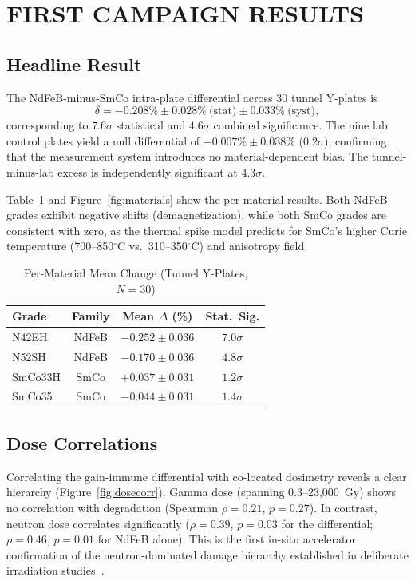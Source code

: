 \documentclass[a4paper,
               ]{jacow}
\begin{document}
\section{FIRST CAMPAIGN RESULTS}

\subsection{Headline Result}

The NdFeB-minus-SmCo intra-plate differential across 30 tunnel Y-plates is
\begin{equation}
\delta = -0.208\% \pm 0.028\%~\text{(stat)} \pm 0.033\%~\text{(syst)},
\end{equation}
corresponding to $7.6\sigma$ statistical and $4.6\sigma$ combined significance. The nine lab control plates yield a null differential of $-0.007\% \pm 0.038\%$ ($0.2\sigma$), confirming that the measurement system introduces no material-dependent bias. The tunnel-minus-lab excess is independently significant at $4.3\sigma$.

Table~\ref{tab:results} and Figure~\ref{fig:materials} show the per-material results. Both NdFeB grades exhibit negative shifts (demagnetization), while both SmCo grades are consistent with zero, as the thermal spike model predicts for SmCo's higher Curie temperature (700--850$^\circ$C vs.\ 310--350$^\circ$C) and anisotropy field.

\begin{table}[!htb]
\centering
\caption{Per-Material Mean Change (Tunnel Y-Plates, $N=30$)}
\label{tab:results}
\begin{tabular}{lccc}
\hline
\textbf{Grade} & \textbf{Family} & \textbf{Mean $\Delta$ (\%)} & \textbf{Stat.\ Sig.} \\
\hline
N42EH   & NdFeB & $-0.252 \pm 0.036$ & $7.0\sigma$ \\
N52SH   & NdFeB & $-0.170 \pm 0.036$ & $4.8\sigma$ \\
SmCo33H & SmCo  & $+0.037 \pm 0.031$ & $1.2\sigma$ \\
SmCo35  & SmCo  & $-0.044 \pm 0.031$ & $1.4\sigma$ \\
\hline
\end{tabular}
\end{table}

\subsection{Dose Correlations}

Correlating the gain-immune differential with co-located dosimetry reveals a clear hierarchy (Figure~\ref{fig:dosecorr}). Gamma dose (spanning 0.3--23,000~Gy) shows no correlation with degradation (Spearman $\rho = 0.21$, $p = 0.27$). In contrast, neutron dose correlates significantly ($\rho = 0.39$, $p = 0.03$ for the differential; $\rho = 0.46$, $p = 0.01$ for NdFeB alone). This is the first in-situ accelerator confirmation of the neutron-dominated damage hierarchy established in deliberate irradiation studies~\cite{Shen:2018, Bizen:2016}.
\end{document}
